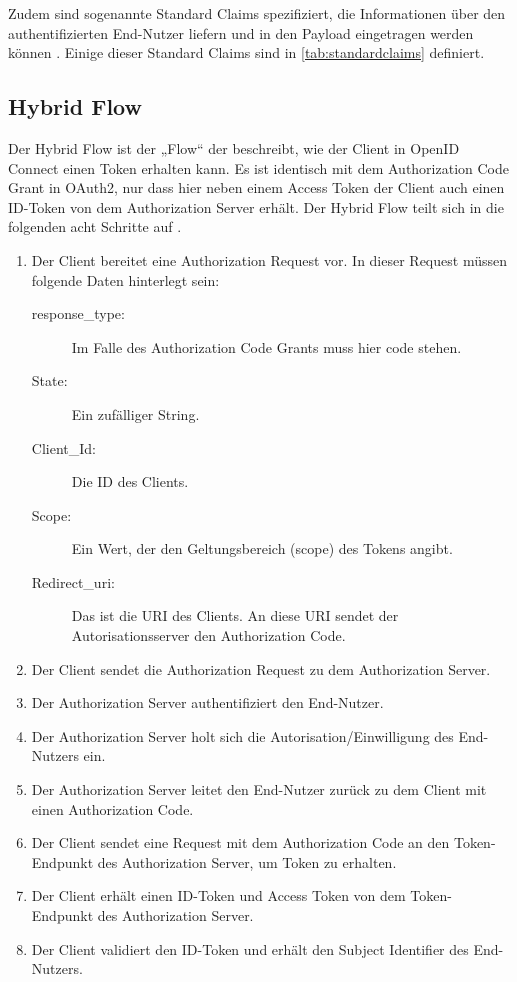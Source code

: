 Zudem sind sogenannte Standard Claims spezifiziert, die Informationen über den 
authentifizierten End-Nutzer liefern und in den Payload eingetragen werden können \citep{openidconnect:2014}.  
Einige dieser Standard Claims sind in \autoref{tab:standardclaims} definiert. 

\subsection{Hybrid Flow}
\label{subsec:OpenIDConnect:HybridFlow}
Der Hybrid Flow ist der „Flow“ der beschreibt, wie der Client in OpenID Connect einen
Token erhalten kann. Es ist identisch mit dem Authorization Code Grant in OAuth2, nur 
dass hier neben einem Access Token der Client auch einen ID-Token von dem Authorization 
Server erhält. Der Hybrid Flow teilt sich in die folgenden acht Schritte auf \citep{openidconnect:2014}.

\begin{enumerate}
  \item Der Client bereitet eine Authorization Request vor. In dieser Request müssen folgende Daten hinterlegt sein:
    \begin{description}
      \item[response\_type:] Im Falle des Authorization Code Grants muss hier code stehen. 
      \item[State:] Ein zufälliger String. 
      \item[Client\_Id:] Die ID des Clients. 
      \item[Scope:] Ein Wert, der den Geltungsbereich (scope) des Tokens angibt. 
      \item[Redirect\_uri:] Das ist die URI des Clients. An diese URI sendet der Autorisationsserver den Authorization Code. 
    \end{description}
  \item Der Client sendet die Authorization Request zu dem Authorization Server.
  \item Der Authorization Server authentifiziert den End-Nutzer. 
  \item Der Authorization Server holt sich die Autorisation/Einwilligung des End-Nutzers ein. 
  \item Der Authorization Server leitet den End-Nutzer zurück zu dem Client mit 
  einen Authorization Code.
  \item Der Client sendet eine Request mit dem Authorization Code an den Token-Endpunkt des Authorization Server, um Token zu erhalten. 
  \item Der Client erhält einen ID-Token und Access Token von dem Token-Endpunkt des Authorization Server.
  \item Der Client validiert den ID-Token und erhält den Subject Identifier des End-Nutzers.    
\end{enumerate}

